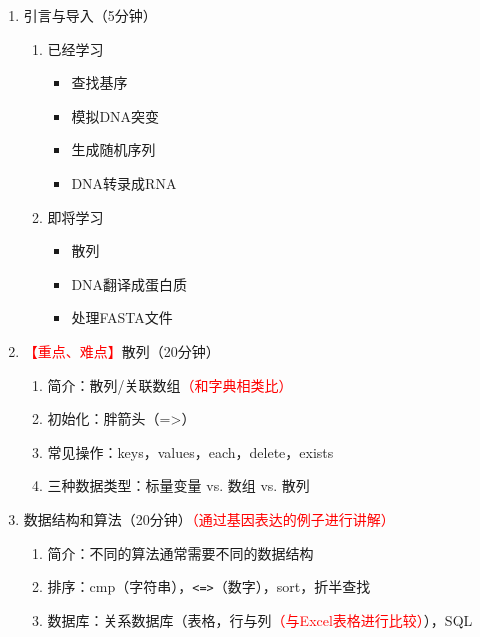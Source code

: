 \documentclass{TIJMUjiaoanLL}
\begin{document}
\begin{enumerate}
  \item 引言与导入（5分钟）
    \begin{enumerate}
      \item 已经学习
	\vspace{-1em}
	\begin{multicols}{2}
	\begin{itemize}
	  \item 查找基序
	  \item 模拟DNA突变
	  \item 生成随机序列
	  \item DNA转录成RNA
	\end{itemize}
	\end{multicols}
	\vspace{-1em}
      \item 即将学习
	\vspace{-1em}
	\begin{multicols}{3}
	\begin{itemize}
	  \item 散列
	  \item DNA翻译成蛋白质
	  \item 处理FASTA文件
	\end{itemize}
	\end{multicols}
	\vspace{-1em}
    \end{enumerate}
  \item \textcolor{red}{【重点、难点】}散列（20分钟）
    \begin{enumerate}
      \item 简介：散列/关联数组\textcolor{red}{（和字典相类比）}
      \item 初始化：胖箭头（=>）
      \item 常见操作：keys，values，each，delete，exists
      \item 三种数据类型：标量变量 vs. 数组 vs. 散列
    \end{enumerate}
  \item 数据结构和算法（20分钟）\textcolor{red}{（通过基因表达的例子进行讲解）}
    \begin{enumerate}
      \item 简介：不同的算法通常需要不同的数据结构
      \item 排序：cmp（字符串），\verb|<=>|（数字），sort，折半查找
      \item 数据库：关系数据库（表格，行与列\textcolor{red}{（与Excel表格进行比较）}），SQL

\end{enumerate}
\end{enumerate}
\end{document}
